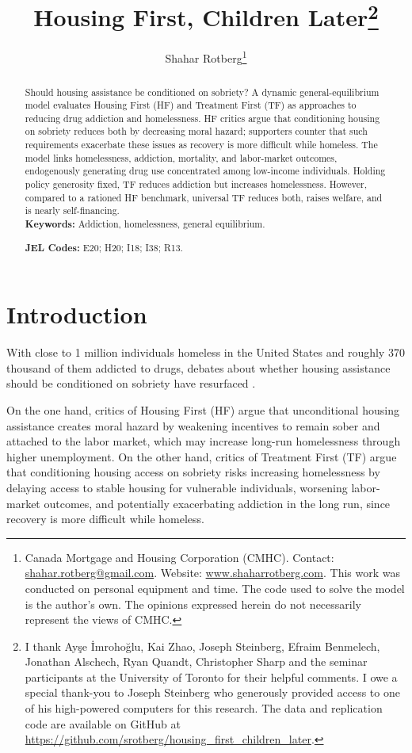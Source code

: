 \documentclass[parskip=full]{article}
\title{\vspace{-1.8cm}Housing First, Children Later\footnote{I thank Ay\c{s}e \.{I}mroho\u{g}lu, Kai Zhao, Joseph Steinberg, Efraim Benmelech, Jonathan Alschech, Ryan Quandt, Christopher Sharp and the seminar participants at the University of Toronto for their helpful comments. I owe a special thank-you to Joseph Steinberg who generously provided access to one of his high-powered computers for this research. The data and replication code are available on GitHub at \url{https://github.com/srotberg/housing_first_children_later}.}}
\author{Shahar Rotberg\footnote{Canada Mortgage and Housing Corporation (CMHC). Contact: \url{shahar.rotberg@gmail.com}. Website: \url{www.shaharrotberg.com}. This work was conducted on personal equipment and time. The code used to solve the model is the author's own. The opinions expressed herein do not necessarily represent the views of CMHC.}}
\theoremstyle{plain}
\theoremstyle{definition}
\theoremstyle{remark}
\begin{document}
\maketitle

\begin{abstract}
\onehalfspacing
\noindent

\noindent Should housing assistance be conditioned on sobriety? A dynamic general-equilibrium model evaluates Housing First (HF) and Treatment First (TF) as approaches to reducing drug addiction and homelessness. HF critics argue that conditioning housing on sobriety reduces both by decreasing moral hazard; supporters counter that such requirements exacerbate these issues as recovery is more difficult while homeless. The model links homelessness, addiction, mortality, and labor-market outcomes, endogenously generating drug use concentrated among low-income individuals. Holding policy generosity fixed, TF reduces addiction but increases homelessness. However, compared to a rationed HF benchmark, universal TF reduces both, raises welfare, and is nearly self-financing.\\[1.5ex]


\noindent \textbf{Keywords:} Addiction, homelessness, general equilibrium. 

\noindent \textbf{JEL Codes:} E20; H20; I18; I38; R13. 

\end{abstract}

\section{Introduction}\label{sec:intro}

With close to 1 million individuals homeless in the United States and roughly 370 thousand of them addicted to drugs, debates about whether housing assistance should be conditioned on sobriety have resurfaced \citep{cityjournal_trump_homelessness,kqed_trump_homelessness}.

On the one hand, critics of Housing First (HF) argue that unconditional housing assistance creates moral hazard by weakening incentives to remain sober and attached to the labor market, which may increase long-run homelessness through higher unemployment. On the other hand, critics of Treatment First (TF) argue that conditioning housing access on sobriety risks increasing homelessness by delaying access to stable housing for vulnerable individuals, worsening labor-market outcomes, and potentially exacerbating addiction in the long run, since recovery is more difficult while homeless.
\end{document}
